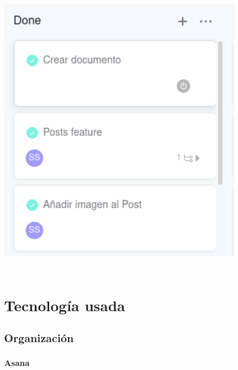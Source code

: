 \documentclass[12pt,a4paper]{article}
\begin{document}
\begin{minipage}{.75\textwidth}
\begin{enumerate}
\begin{minipage}{.50\textwidth}
  \includegraphics[width=0.9\textwidth, right]{done}
\end{minipage}\\

\end{enumerate}

\end{minipage}




\newpage

\section{Tecnología usada}

\subsection{Organización}

\subsubsection{Asana}
\end{document}
